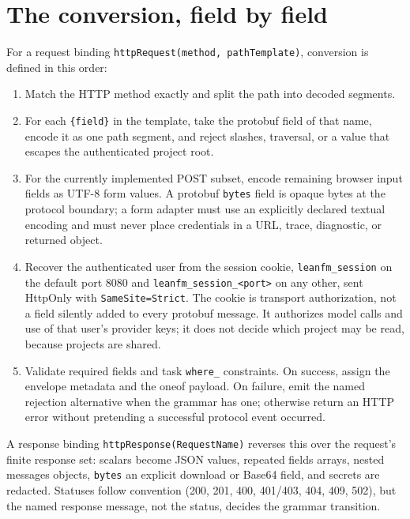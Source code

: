 \section{The conversion, field by field}

For a request binding \texttt{httpRequest(method, pathTemplate)}, conversion is
defined in this order:

\begin{enumerate}
  \item Match the HTTP method exactly and split the path into decoded segments.
  \item For each \texttt{\{field\}} in the template, take the protobuf field of
        that name, encode it as one path segment, and reject slashes, traversal,
        or a value that escapes the authenticated project root.
  \item For the currently implemented POST subset, encode remaining browser
        input fields as UTF-8 form values. A protobuf \texttt{bytes} field is
        opaque bytes at the protocol boundary; a form adapter must use an
        explicitly declared textual encoding and must never place credentials
        in a URL, trace, diagnostic, or returned object.
  \item Recover the authenticated user from the session cookie,
        \texttt{leanfm\_session} on the default port 8080 and
        \texttt{leanfm\_session\_<port>} on any other, sent HttpOnly with
        \texttt{SameSite=Strict}. The cookie is
        transport authorization, not a field silently added to every protobuf
        message. It authorizes model calls and use of that user's provider
        keys; it does not decide which project may be read, because projects
        are shared.
  \item Validate required fields and task \texttt{where\_} constraints. On
        success, assign the envelope metadata and the oneof payload. On failure,
        emit the named rejection alternative when the grammar has one; otherwise
        return an HTTP error without pretending a successful protocol event
        occurred.
\end{enumerate}

A response binding \texttt{httpResponse(RequestName)} reverses this over the
request's finite response set: scalars become JSON values, repeated fields arrays,
nested messages objects, \texttt{bytes} an explicit download or Base64 field, and
secrets are redacted. Statuses follow convention (200, 201, 400, 401/403, 404,
409, 502), but the named response message, not the status, decides the grammar
transition.

